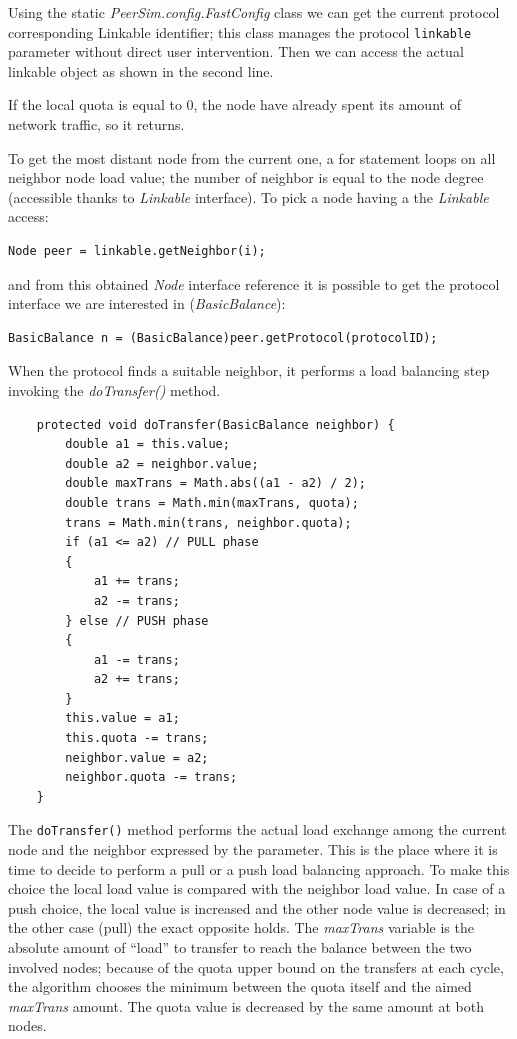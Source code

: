 \documentclass[a4paper,11pt]{article}
\begin{document}
Using the static \emph{PeerSim.config.FastConfig} class we can get the
current protocol corresponding Linkable identifier; this class manages
the protocol \texttt{linkable} parameter without direct user
intervention. Then we can access the actual linkable object as shown
in the second line.

If the local quota is equal to 0, the node have already
spent its amount of network traffic, so it returns.

To get the most distant node from the current one, a for statement loops on
all neighbor node load value; the number of neighbor is equal to the
node degree (accessible thanks to \emph{Linkable} interface). To pick
a node having a the \emph{Linkable} access:

\begin{verbatim}
Node peer = linkable.getNeighbor(i);
\end{verbatim}

and from this obtained \emph{Node} interface reference it is possible
to get the protocol interface we are interested in (\emph{BasicBalance}):

\begin{verbatim}
BasicBalance n = (BasicBalance)peer.getProtocol(protocolID);
\end{verbatim}

When the protocol finds a suitable neighbor, it performs a load balancing
step invoking the \emph{doTransfer()} method.

\footnotesize
\begin{verbatim}
    protected void doTransfer(BasicBalance neighbor) {
        double a1 = this.value;
        double a2 = neighbor.value;
        double maxTrans = Math.abs((a1 - a2) / 2);
        double trans = Math.min(maxTrans, quota);
        trans = Math.min(trans, neighbor.quota);
        if (a1 <= a2) // PULL phase
        {
            a1 += trans;
            a2 -= trans;
        } else // PUSH phase
        {
            a1 -= trans;
            a2 += trans;
        }
        this.value = a1;
        this.quota -= trans;
        neighbor.value = a2;
        neighbor.quota -= trans;
    }
\end{verbatim}
\normalsize


The \texttt{doTransfer()} method performs the actual load exchange
among the current node and the neighbor expressed by the parameter.
This is the place where it is time to decide to perform a pull or a
push load balancing approach. To make this choice the local load value
is compared with the neighbor load value. In case of a push choice,
the local value is increased and the other node value is decreased;
in the other case (pull) the exact opposite holds. The \emph{maxTrans}
variable is the absolute amount of ``{}load'' to transfer
to reach the balance between the two involved nodes; because of the
quota upper bound on the transfers at each cycle, the algorithm chooses
the minimum between the quota itself and the aimed \emph{maxTrans}
amount. The quota value is decreased by the same amount at both nodes.
\end{document}
